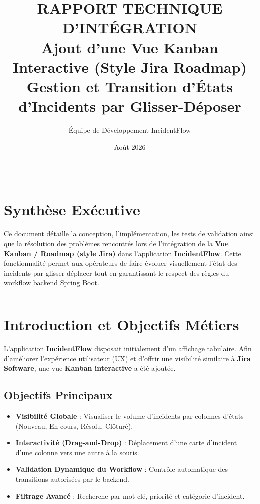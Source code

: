 \documentclass[11pt,a4paper]{article}
\title{\textbf{RAPPORT TECHNIQUE D'INTÉGRATION}\\[0.2cm]
\Large\textbf{Ajout d'une Vue Kanban Interactive (Style Jira Roadmap)}\\[0.1cm]
\small Gestion et Transition d'États d'Incidents par Glisser-Déposer}
\author{Équipe de Développement IncidentFlow}
\date{Août 2026}
\begin{document}
\maketitle

\hrule
\vspace{0.3cm}

\section*{Synthèse Exécutive}
Ce document détaille la conception, l'implémentation, les tests de validation ainsi que la résolution des problèmes rencontrés lors de l'intégration de la \textbf{Vue Kanban / Roadmap (style Jira)} dans l'application \textbf{IncidentFlow}. Cette fonctionnalité permet aux opérateurs de faire évoluer visuellement l'état des incidents par glisser-déplacer tout en garantissant le respect des règles du workflow backend Spring Boot.

\vspace{0.3cm}
\hrule
\vspace{0.5cm}

\tableofcontents
\newpage

\section{Introduction et Objectifs Métiers}

L'application \textbf{IncidentFlow} disposait initialement d'un affichage tabulaire. Afin d'améliorer l'expérience utilisateur (UX) et d'offrir une visibilité similaire à \textbf{Jira Software}, une vue \textbf{Kanban interactive} a été ajoutée.

\subsection{Objectifs Principaux}
\begin{itemize}
    \item \textbf{Visibilité Globale} : Visualiser le volume d'incidents par colonnes d'états (Nouveau, En cours, Résolu, Clôturé).
    \item \textbf{Interactivité (Drag-and-Drop)} : Déplacement d'une carte d'incident d'une colonne vers une autre à la souris.
    \item \textbf{Validation Dynamique du Workflow} : Contrôle automatique des transitions autorisées par le backend.
    \item \textbf{Filtrage Avancé} : Recherche par mot-clé, priorité et catégorie d'incident.
\end{itemize}
\end{document}
